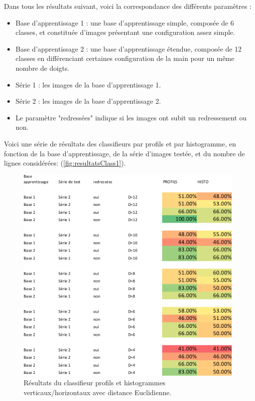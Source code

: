 Dans tous les résultats suivant, voici la correspondance des différents paramètres :
\begin{itemize}
\item Base d'apprentissage 1 : une base d'apprentissage simple, composée de 6 classes, et  constituée d'images présentant une configuration assez simple.
\item Base d'apprentissage 2 : une base d'apprentissage étendue, composée de 12 classes en différenciant certaines configuration de la main pour un même nombre de doigts.
\item Série 1 : les images de la base d'apprentissage 1.
\item Série 2 : les images de la base d'apprentissage 2.
\item Le paramètre "redressées" indique si les images ont subit un redressement ou non.
\end{itemize}

Voici une série de résultats des classifieurs par profils et par histogramme, en fonction de la base d'apprentissage, de la série d'images testée, et du nombre de lignes considérées: (\autoref{fig:resultatsClass1}).

\begin{figure}[htb!]
\centerline{\includegraphics[scale=0.7]{table.png}}
\caption{Résultats du classifieur profils et histogrammes verticaux/horizontaux avec distance Euclidienne.}
\label{fig:resultatsClass1}
\end{figure}

